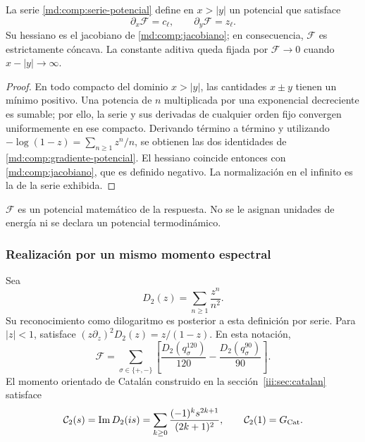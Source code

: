 \begin{proposition}
\label{md:comp:prop-potencial}
La serie \eqref{md:comp:serie-potencial} define en \(x>|y|\) un potencial
que satisface
\begin{equation}
 \boxed{\partial_x\mathscr F=c_\ell,\qquad
        \partial_y\mathscr F=z_\ell.}
 \label{md:comp:gradiente-potencial}
\end{equation}
Su hessiano es el jacobiano de
\eqref{md:comp:jacobiano}; en consecuencia, \(\mathscr F\) es
estrictamente cóncava. La constante aditiva queda fijada por
\(\mathscr F\longrightarrow0\) cuando \(x-|y|\longrightarrow\infty\).
\end{proposition}
\begin{proof}
En todo compacto del dominio \(x>|y|\), las cantidades \(x\pm y\)
tienen un mínimo positivo. Una potencia de \(n\) multiplicada por una
exponencial decreciente es sumable; por ello, la serie y sus derivadas
de cualquier orden fijo convergen uniformemente en ese compacto.
Derivando término a término y utilizando
\(-\log(1-z)=\sum_{n\geq1}z^n/n\), se obtienen las dos identidades
de \eqref{md:comp:gradiente-potencial}. El hessiano coincide entonces
con \eqref{md:comp:jacobiano}, que es definido negativo.
La normalización en el infinito es la de la serie exhibida.
\end{proof}

\(\mathscr F\) es un potencial matemático de la respuesta. No se le
asignan unidades de energía ni se declara un potencial termodinámico.

\subsubsection{Realización por un mismo momento espectral}
\label{md:comp:momento-espectral}

Sea
\[
 D_2(z)=\sum_{n\geq1}\frac{z^n}{n^2}.
\]
Su reconocimiento como dilogaritmo es posterior a esta definición por
serie. Para \(|z|<1\), satisface
\((z\partial_z)^2D_2(z)=z/(1-z)\). En esta notación,
\begin{equation}
 \mathscr F=
 \sum_{\sigma\in\{+,-\}}
 \left[\frac{D_2(q_\sigma^{120})}{120}
       -\frac{D_2(q_\sigma^{90})}{90}\right].
 \label{md:comp:potencial-dos-momentos}
\end{equation}
El momento orientado de Catalán construido en la sección~\ref{iii:sec:catalan} satisface
\begin{equation}
 \mathcal C_2(s)=\operatorname{Im}D_2(is)
 =\sum_{k\geq0}\frac{(-1)^ks^{2k+1}}{(2k+1)^2},\qquad
 \mathcal C_2(1)=G_{\rm Cat}.
 \label{md:comp:catalan-momento}
\end{equation}

